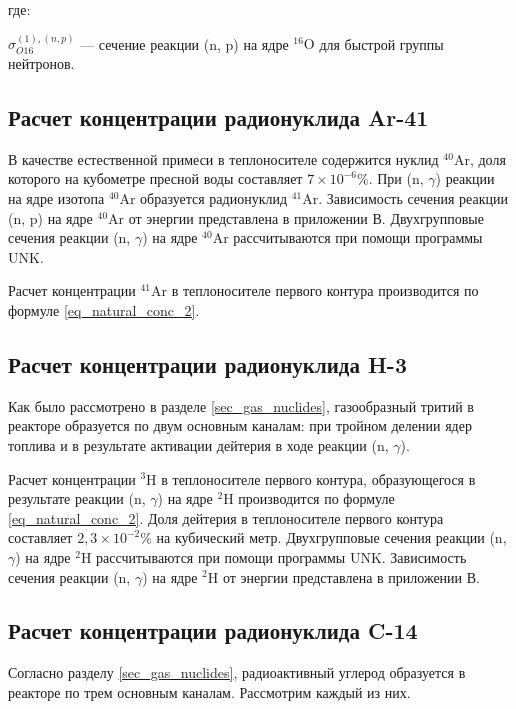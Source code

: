 где:
\begin{description}
    \item $\sigma_{O16}^{(1), (n, p)}$ --- сечение реакции (n, p) на ядре $^{16}\text{O}$ для быстрой группы нейтронов.
\end{description}

\subsection{Расчет концентрации радионуклида Ar-41}

В качестве естественной примеси в теплоносителе содержится нуклид $^{40}\text{Ar}$, доля которого на кубометре пресной 
воды составляет $7 \times 10^{-6} \%$. При (n, $\gamma$) реакции на ядре изотопа $^{40}\text{Ar}$ образуется радионуклид 
$^{41}\text{Ar}$. Зависимость сечения реакции (n, p) на ядре $^{40}\text{Ar}$ от энергии представлена в 
приложении В. Двухгрупповые сечения реакции (n, $\gamma$) на ядре $^{40}\text{Ar}$ рассчитываются при помощи программы 
UNK.

Расчет концентрации $^{41}\text{Ar}$ в теплоносителе первого контура производится по формуле \ref{eq_natural_conc_2}.

\subsection{Расчет концентрации радионуклида H-3}

Как было рассмотрено в разделе \ref{sec_gas_nuclides}, газообразный тритий в реакторе образуется по двум основным 
каналам: при тройном делении ядер топлива и в результате активации дейтерия в ходе реакции (n, $\gamma$). 

Расчет концентрации $^{3}\text{H}$ в теплоносителе первого контура, образующегося в результате реакции (n, $\gamma$) на 
ядре $^{2}\text{H}$ производится по формуле \ref{eq_natural_conc_2}. Доля дейтерия в теплоносителе первого контура 
составляет $2,3 \times 10^{-2} \%$ на кубический метр. Двухгрупповые сечения реакции (n, $\gamma$) на ядре 
$^{2}\text{H}$ рассчитываются при помощи программы UNK. Зависимость сечения реакции (n, $\gamma$) на ядре $^{2}\text{H}$ 
от энергии представлена в приложении В.

\subsection{Расчет концентрации радионуклида C-14}

Согласно разделу \ref{sec_gas_nuclides}, радиоактивный углерод образуется в реакторе по трем основным каналам. 
Рассмотрим каждый из них.

